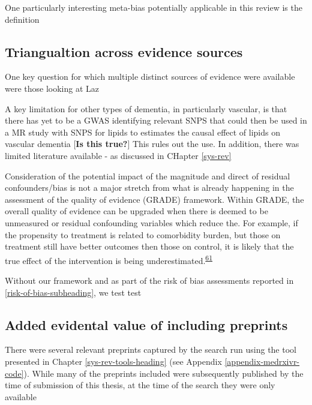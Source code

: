 \documentclass[a4paper, twoside]{templates/ociamthesis}
\begin{document}
One particularly interesting meta-bias potentially applicable in this review is the definition

\hypertarget{triangualtion-across-evidence-sources}{%
\subsection{Triangualtion across evidence sources}\label{triangualtion-across-evidence-sources}}

One key question for which multiple distinct sources of evidence were available were those looking at Laz

A key limitation for other types of dementia, in particularly vascular, is that there has yet to be a GWAS identifying relevant SNPS that could then be used in a MR study with SNPS for lipids to estimates the causal effect of lipids on vascular dementia {[}\textbf{Is this true?}{]} This rules out the use. In addition, there was limited literature available - as discussed in CHapter \ref{sys-rev}

Consideration of the potential impact of the magnitude and direct of residual confounders/bias is not a major stretch from what is already happening in the assessment of the quality of evidence (GRADE) framework. Within GRADE, the overall quality of evidence can be upgraded when there is deemed to be unmeasured or residual confounding variables which reduce the. For example, if the propensity to treatment is related to comorbidity burden, but those on treatment still have better outcomes then those on control, it is likely that the true effect of the intervention is being underestimated.\textsuperscript{\protect\hyperlink{ref-guyatt2011}{61}}

Without our framework and as part of the risk of bias assessments reported in \ref{risk-of-bias-subheading}, we test test

\hypertarget{added-evidental-value-of-including-preprints}{%
\subsection{Added evidental value of including preprints}\label{added-evidental-value-of-including-preprints}}

There were several relevant preprints captured by the search run using the tool presented in Chapter \ref{sys-rev-tools-heading} (see Appendix \ref{appendix-medrxivr-code}). While many of the preprints included were subsequently published by the time of submission of this thesis, at the time of the search they were only available
\end{document}
